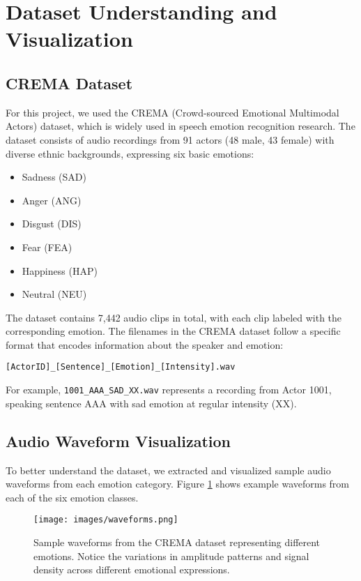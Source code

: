 \section{Dataset Understanding and Visualization}

\subsection{CREMA Dataset}

For this project, we used the CREMA (Crowd-sourced Emotional Multimodal Actors) dataset, which is widely used in speech emotion recognition research. The dataset consists of audio recordings from 91 actors (48 male, 43 female) with diverse ethnic backgrounds, expressing six basic emotions:

\begin{itemize}
    \item Sadness (SAD)
    \item Anger (ANG)
    \item Disgust (DIS)
    \item Fear (FEA)
    \item Happiness (HAP)
    \item Neutral (NEU)
\end{itemize}

The dataset contains 7,442 audio clips in total, with each clip labeled with the corresponding emotion. The filenames in the CREMA dataset follow a specific format that encodes information about the speaker and emotion: 

\texttt{[ActorID]\_[Sentence]\_[Emotion]\_[Intensity].wav}

For example, \texttt{1001\_AAA\_SAD\_XX.wav} represents a recording from Actor 1001, speaking sentence AAA with sad emotion at regular intensity (XX).

\subsection{Audio Waveform Visualization}

To better understand the dataset, we extracted and visualized sample audio waveforms from each emotion category. Figure \ref{fig:waveforms} shows example waveforms from each of the six emotion classes.

\begin{figure}[h]
    \centering
    \texttt{[image: images/waveforms.png]}
    \caption{Sample waveforms from the CREMA dataset representing different emotions. Notice the variations in amplitude patterns and signal density across different emotional expressions.}
    \label{fig:waveforms}
\end{figure}

